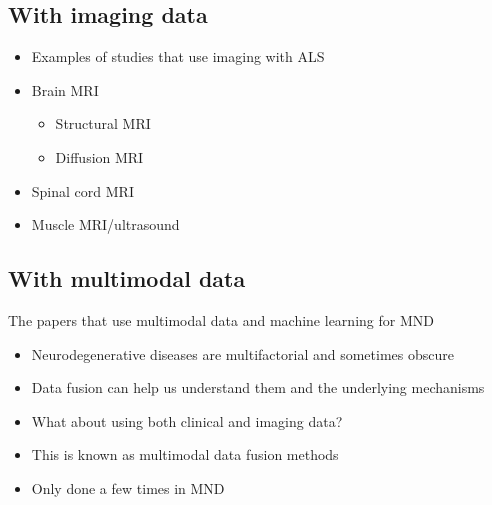 \subsection{With imaging data}

\begin{itemize}
    \item Examples of studies that use imaging with ALS
    \item Brain MRI
    \begin{itemize}
        \item Structural MRI
        \item Diffusion MRI
    \end{itemize}
    \item Spinal cord MRI
    \item Muscle MRI/ultrasound
\end{itemize}


\subsection{With multimodal data}

The papers that use multimodal data and machine learning for MND

\begin{itemize}
    \item Neurodegenerative diseases are multifactorial and sometimes obscure
    \item Data fusion can help us understand them and the underlying mechanisms
    \item What about using both clinical and imaging data?
    \item This is known as multimodal data fusion methods
    \item Only done a few times in MND
\end{itemize}


